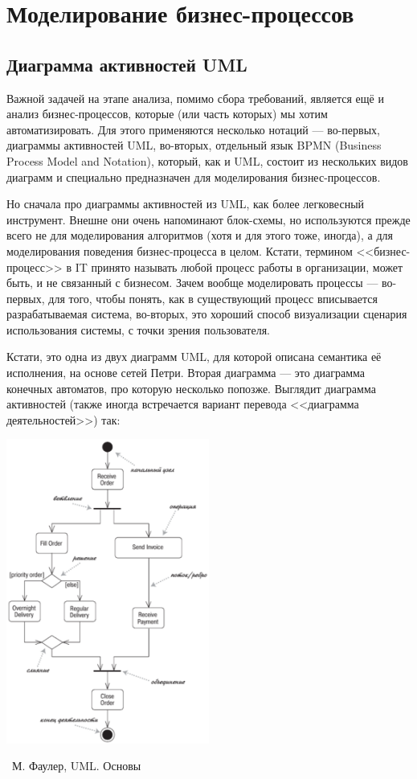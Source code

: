 \documentclass[a5paper]{article}
\newcommand{\attribution}[1] {
    \vspace{-4mm}\begin{flushright}\begin{scriptsize}%
    {\textcopyright\, #1}\end{scriptsize}\end{flushright}
}
\begin{document}
\section{Моделирование бизнес-процессов}

\subsection{Диаграмма активностей UML}

Важной задачей на этапе анализа, помимо сбора требований, является ещё и анализ бизнес-процессов, которые (или часть которых) мы хотим автоматизировать. Для этого применяются несколько нотаций --- во-первых, диаграммы активностей UML, во-вторых, отдельный язык BPMN (Business Process Model and Notation), который, как и UML, состоит из нескольких видов диаграмм и специально предназначен для моделирования бизнес-процессов.

Но сначала про диаграммы активностей из UML, как более легковесный инструмент. Внешне они очень напоминают блок-схемы, но используются прежде всего не для моделирования алгоритмов (хотя и для этого тоже, иногда), а для моделирования поведения бизнес-процесса в целом. Кстати, термином <<бизнес-процесс>> в IT принято называть любой процесс работы в организации, может быть, и не связанный с бизнесом. Зачем вообще моделировать процессы --- во-первых, для того, чтобы понять, как в существующий процесс вписывается разрабатываемая система, во-вторых, это хороший способ визуализации сценария использования системы, с точки зрения пользователя.

Кстати, это одна из двух диаграмм UML, для которой описана семантика её исполнения, на основе сетей Петри. Вторая диаграмма --- это диаграмма конечных автоматов, про которую несколько попозже. Выглядит диаграмма активностей (также иногда встречается вариант перевода <<диаграмма деятельностей>>) так:

\begin{center}
    \includegraphics[width=0.5\textwidth]{activityDiagram.png}
    \attribution{М. Фаулер, UML. Основы}
\end{center}
\end{document}
